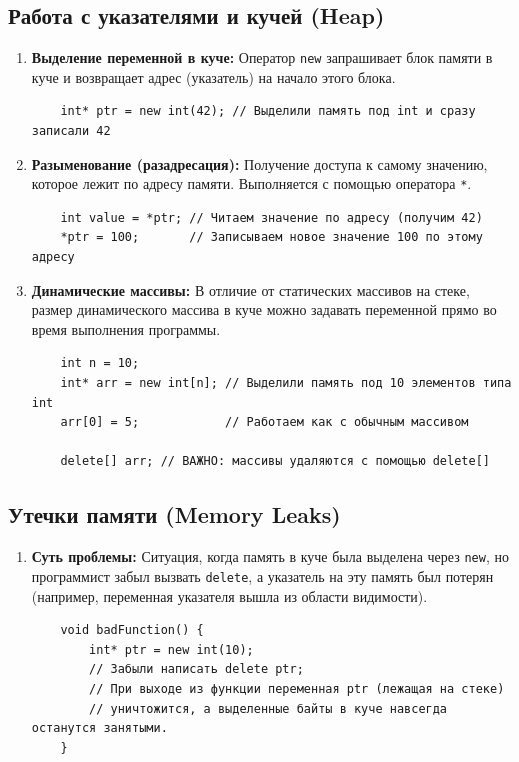 \documentclass[a4paper, 12pt]{article}
\newcommand{\term}[1]{\textbf{#1}} %
\newcommand{\code}[1]{\texttt{#1}} %
\begin{document}
\subsection*{Работа с указателями и кучей (Heap)}
\begin{enumerate}
    \item \term{Выделение переменной в куче:} Оператор \code{new} запрашивает блок памяти в куче и возвращает адрес (указатель) на начало этого блока.
    \begin{verbatim}
    int* ptr = new int(42); // Выделили память под int и сразу записали 42
    \end{verbatim}
    
    \item \term{Разыменование (разадресация):} Получение доступа к самому значению, которое лежит по адресу памяти. Выполняется с помощью оператора \code{*}.
    \begin{verbatim}
    int value = *ptr; // Читаем значение по адресу (получим 42)
    *ptr = 100;       // Записываем новое значение 100 по этому адресу
    \end{verbatim}

    \item \term{Динамические массивы:} В отличие от статических массивов на стеке, размер динамического массива в куче можно задавать переменной прямо во время выполнения программы.
    \begin{verbatim}
    int n = 10;
    int* arr = new int[n]; // Выделили память под 10 элементов типа int
    arr[0] = 5;            // Работаем как с обычным массивом
    
    delete[] arr; // ВАЖНО: массивы удаляются с помощью delete[]
    \end{verbatim}
\end{enumerate}

\subsection*{Утечки памяти (Memory Leaks)}
\begin{enumerate}
    \item \term{Суть проблемы:} Ситуация, когда память в куче была выделена через \code{new}, но программист забыл вызвать \code{delete}, а указатель на эту память был потерян (например, переменная указателя вышла из области видимости). 
    
    \begin{verbatim}
    void badFunction() {
        int* ptr = new int(10);
        // Забыли написать delete ptr;
        // При выходе из функции переменная ptr (лежащая на стеке) 
        // уничтожится, а выделенные байты в куче навсегда останутся занятыми.
    }
    \end{verbatim}
\end{enumerate}
\end{document}
